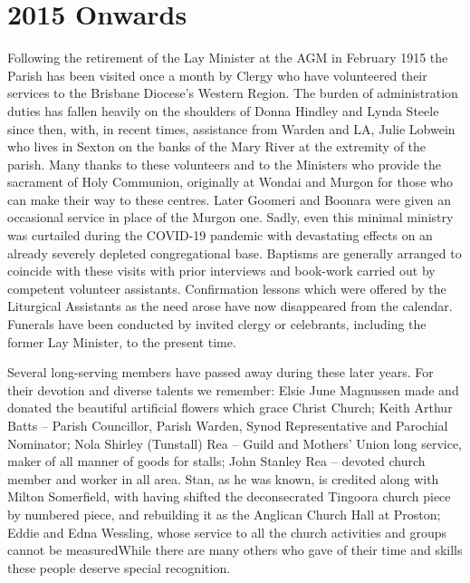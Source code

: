 \section{2015 Onwards}



Following the retirement of the Lay Minister at the AGM in February 1915 the Parish has been visited once a month by Clergy who have volunteered their services to the Brisbane Diocese's Western Region. The burden of administration duties has fallen heavily on the shoulders of Donna Hindley and Lynda Steele since then, with, in recent times, assistance from Warden and LA, Julie Lobwein who lives in Sexton on the banks of the Mary River at the extremity of the parish. Many thanks to these volunteers and to the Ministers who provide the sacrament of Holy Communion, originally at Wondai and Murgon for those who can make their way to these centres. Later Goomeri and Boonara were given an occasional service in place of the Murgon one. Sadly, even this minimal ministry was curtailed during the COVID-19 pandemic with devastating effects on an already severely depleted congregational base. Baptisms are generally arranged to coincide with these visits with prior interviews and book-work carried out by competent volunteer assistants. Confirmation lessons which were offered by the Liturgical Assistants as the need arose have now disappeared from the calendar. Funerals have been conducted by invited clergy or celebrants, including the former Lay Minister, to the present time.



Several long-serving members have passed away during these later years. For their devotion and diverse talents we remember: Elsie June Magnussen made and donated the beautiful artificial flowers which grace Christ Church; Keith Arthur Batts -- Parish Councillor, Parish Warden, Synod Representative and Parochial Nominator; Nola Shirley (Tunstall) Rea -- Guild and Mothers' Union long service, maker of all manner of goods for stalls; John Stanley Rea -- devoted church member and worker in all area. Stan, as he was known, is credited along with Milton Somerfield, with having shifted the deconsecrated Tingoora church piece by numbered piece, and rebuilding it as the Anglican Church Hall at Proston; Eddie and Edna Wessling, whose service to all the church activities and groups cannot be measuredWhile there are many others who gave of their time and skills these people deserve special recognition.



